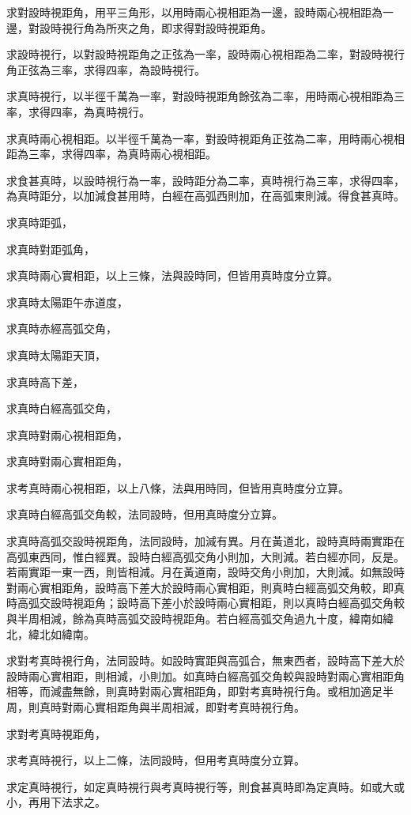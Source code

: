 \begin{pinyinscope}
求對設時視距角，用平三角形，以用時兩心視相距為一邊，設時兩心視相距為一邊，對設時視行角為所夾之角，即求得對設時視距角。

求設時視行，以對設時視距角之正弦為一率，設時兩心視相距為二率，對設時視行角正弦為三率，求得四率，為設時視行。

求真時視行，以半徑千萬為一率，對設時視距角餘弦為二率，用時兩心視相距為三率，求得四率，為真時視行。

求真時兩心視相距。以半徑千萬為一率，對設時視距角正弦為二率，用時兩心視相距為三率，求得四率，為真時兩心視相距。

求食甚真時，以設時視行為一率，設時距分為二率，真時視行為三率，求得四率，為真時距分，以加減食甚用時，白經在高弧西則加，在高弧東則減。得食甚真時。

求真時距弧，

求真時對距弧角，

求真時兩心實相距，以上三條，法與設時同，但皆用真時度分立算。

求真時太陽距午赤道度，

求真時赤經高弧交角，

求真時太陽距天頂，

求真時高下差，

求真時白經高弧交角，

求真時對兩心視相距角，

求真時對兩心實相距角，

求考真時兩心視相距，以上八條，法與用時同，但皆用真時度分立算。

求真時白經高弧交角較，法同設時，但用真時度分立算。

求真時高弧交設時視距角，法同設時，加減有異。月在黃道北，設時真時兩實距在高弧東西同，惟白經異。設時白經高弧交角小則加，大則減。若白經亦同，反是。若兩實距一東一西，則皆相減。月在黃道南，設時交角小則加，大則減。如無設時對兩心實相距角，設時高下差大於設時兩心實相距，則真時白經高弧交角較，即真時高弧交設時視距角；設時高下差小於設時兩心實相距，則以真時白經高弧交角較與半周相減，餘為真時高弧交設時視距角。若白經高弧交角過九十度，緯南如緯北，緯北如緯南。

求對考真時視行角，法同設時。如設時實距與高弧合，無東西者，設時高下差大於設時兩心實相距，則相減，小則加。如真時白經高弧交角較與設時對兩心實相距角相等，而減盡無餘，則真時對兩心實相距角，即對考真時視行角。或相加適足半周，則真時對兩心實相距角與半周相減，即對考真時視行角。

求對考真時視距角，

求考真時視行，以上二條，法同設時，但用考真時度分立算。

求定真時視行，如定真時視行與考真時視行等，則食甚真時即為定真時。如或大或小，再用下法求之。


\end{pinyinscope}
